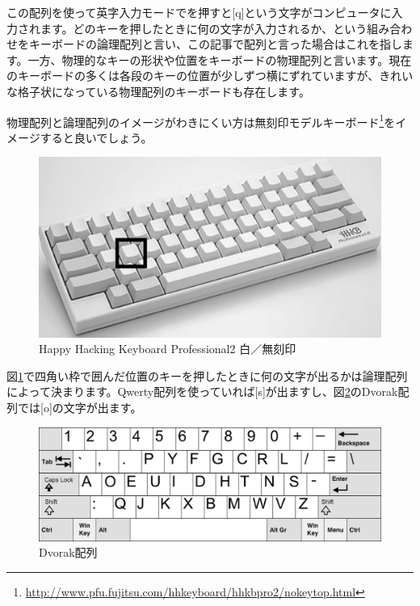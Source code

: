 この配列を使って英字入力モードでを押すと[q]という文字がコンピュータに入力されます。どのキーを押したときに何の文字が入力されるか、という組み合わせをキーボードの論理配列と言い、この記事で配列と言った場合はこれを指します。一方、物理的なキーの形状や位置をキーボードの物理配列と言います。現在のキーボードの多くは各段のキーの位置が少しずつ横にずれていますが、きれいな格子状になっている物理配列のキーボードも存在します。

物理配列と論理配列のイメージがわきにくい方は無刻印モデルキーボード\footnote{\url{http://www.pfu.fujitsu.com/hhkeyboard/hhkbpro2/nokeytop.html}}をイメージすると良いでしょう。

\begin{figure}
 \begin{center}
   \includegraphics[width=14cm,clip]{res_tomoemon/nokeytop.eps}
 \end{center}
 \caption{Happy Hacking Keyboard Professional2 白／無刻印}
 \label{nokeytop}
\end{figure}


図\ref{nokeytop}で四角い枠で囲んだ位置のキーを押したときに何の文字が出るかは論理配列によって決まります。Qwerty配列を使っていれば[s]が出ますし、図\ref{dvorak}のDvorak配列では[o]の文字が出ます。

\begin{figure}
 \begin{center}
   \includegraphics[width=14cm,clip]{res_tomoemon/dvorak.eps}
 \end{center}
 \caption{Dvorak配列}
 \label{dvorak}
\end{figure}

